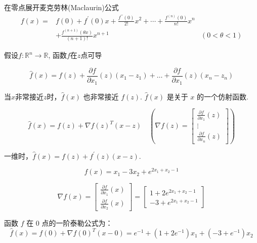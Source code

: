 \begin{corollary}在零点展开麦克劳林(Maclaurin)公式
    $$ \begin{aligned} f(x)=& f(0)+f^{\prime}(0) x+\frac{f^{\prime \prime}(0)}{2 !} x^{2}+\cdots+\frac{f^{(n)}(0)}{n !} x^{n} \\ &+\frac{f^{(n+1)}(\theta x)}{(n+1) !} x^{n+1} &(0<\theta<1) \end{aligned} $$
    
\end{corollary}

\begin{definition}[一阶泰勒公式]
    假设$ f: \mathbb{R}^{n} \rightarrow \mathbb{R} $, 函数$f$在$z$点可导

    $$ \hat{f}(x)=f(z)+\frac{\partial f}{\partial x_{1}}(z)\left(x_{1}-z_{1}\right)+\ldots+\frac{\partial f}{\partial x_{1}}(z)\left(x_{n}-z_{n}\right) $$
\end{definition}

当$x$非常接近$z$时，$ \hat{f}(x) $ 也非常接近 $ f(z) $.  
$ \hat{f}(x) $ 是关于 $ x $ 的一个仿射函数. 

\begin{corollary}[一阶泰勒公式的内积形式]
    $$ \hat{f}(x)=f(z)+\nabla f(z)^{T}(x-z) \quad (\nabla f(z)=\left[\begin{array}{c}\frac{\partial f}{\partial x_{1}}(z) \\ \vdots \\ \frac{\partial f}{\partial x_{n}}(z)\end{array}\right]) $$
\end{corollary} 

一维时，$ \hat{f}(x)=f(z)+f^{\prime}(z)(x-z) $.

\begin{example}
    $$ f(x)=x_{1}-3 x_{2}+e^{2 x_{1}+x_{2}-1} $$

    $$ \nabla f(x)=\left[\begin{array}{l}\frac{\partial f}{\partial x_{1}}(x) \\ \frac{\partial f}{\partial x_{2}}(x)\end{array}\right]=\left[\begin{array}{l}1+2 e^{2 x_{1}+x_{2}-1} \\ -3+e^{2 x_{1}+x_{2}-1}\end{array}\right] $$

    函数 $ f $ 在 0 点的一阶泰勒公式为：
    $$ \hat{f}(x)=f(0)+\nabla f(0)^{T}(x-0)=e^{-1}+\left(1+2 e^{-1}\right) x_{1}+\left(-3+e^{-1}\right) x_{2} $$
\end{example}

